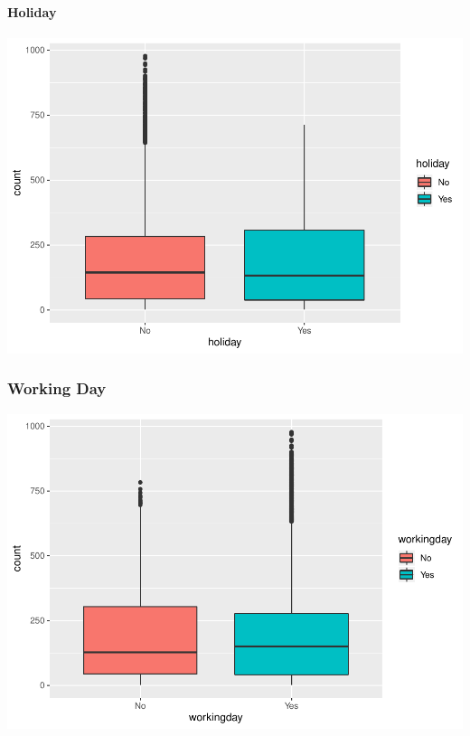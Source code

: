 \documentclass[american,]{article}
\let\oldparagraph\paragraph
\renewcommand{\paragraph}[1]{\oldparagraph{#1}\mbox{}}
\begin{document}
\newpage

\hypertarget{holiday}{%
\paragraph{Holiday}\label{holiday}}

\includegraphics{BikeSharingDemand_files/figure-latex/train.mod.1.holiday-1.pdf}

\hypertarget{working-day}{%
\subsubsection{Working Day}\label{working-day}}

\includegraphics{BikeSharingDemand_files/figure-latex/train.mod.1.workingday-1.pdf}

\newpage
\end{document}
